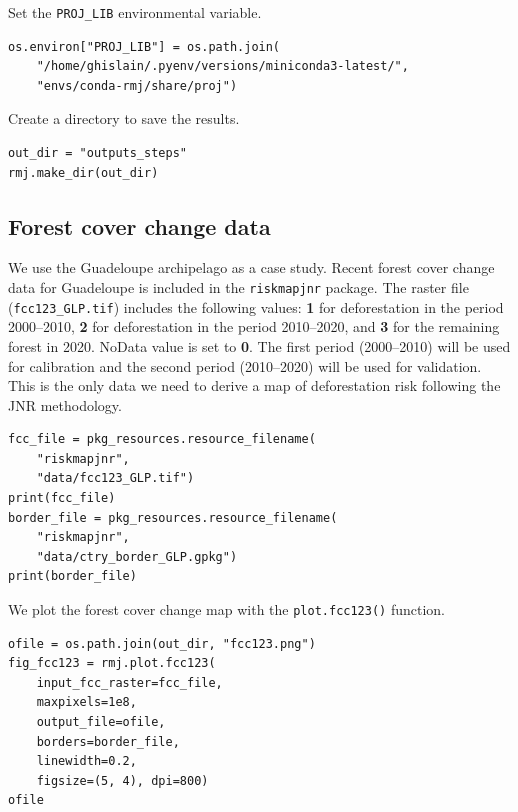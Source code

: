 \documentclass[paper=a4, 12pt, DIV=12]{scrartcl}
\begin{document}
Set the \texttt{PROJ\_LIB} environmental variable.

\begin{verbatim}
os.environ["PROJ_LIB"] = os.path.join(
    "/home/ghislain/.pyenv/versions/miniconda3-latest/",
    "envs/conda-rmj/share/proj")
\end{verbatim}

Create a directory to save the results.

\begin{verbatim}
out_dir = "outputs_steps"
rmj.make_dir(out_dir)
\end{verbatim}

\subsection{Forest cover change data}
\label{sec:orgc31a750}

We use the Guadeloupe archipelago as a case study. Recent forest cover change data for Guadeloupe is included in the \texttt{riskmapjnr} package. The raster file (\texttt{fcc123\_GLP.tif}) includes the following values: \textbf{1} for deforestation in the period 2000--2010, \textbf{2} for deforestation in the period 2010--2020, and \textbf{3} for the remaining forest in 2020. NoData value is set to \textbf{0}. The first period (2000--2010) will be used for calibration and the second period (2010--2020) will be used for validation. This is the only data we need to derive a map of deforestation risk following the JNR methodology.

\begin{verbatim}
fcc_file = pkg_resources.resource_filename(
    "riskmapjnr",
    "data/fcc123_GLP.tif")
print(fcc_file)
border_file = pkg_resources.resource_filename(
    "riskmapjnr",
    "data/ctry_border_GLP.gpkg")
print(border_file)
\end{verbatim}

We plot the forest cover change map with the \texttt{plot.fcc123()} function.

\begin{verbatim}
ofile = os.path.join(out_dir, "fcc123.png")
fig_fcc123 = rmj.plot.fcc123(
    input_fcc_raster=fcc_file,
    maxpixels=1e8,
    output_file=ofile,
    borders=border_file,
    linewidth=0.2,
    figsize=(5, 4), dpi=800)
ofile
\end{verbatim}
\end{document}
